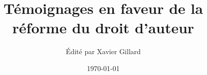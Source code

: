 \documentclass[11pt,liststotoc,bibtotoc]{scrbook}
\title{Témoignages en faveur de la réforme du droit d'auteur}
\author{Édité par Xavier Gillard}
\date{\today}
\begin{document}
\renewcommand{\labelitemi}{$\bullet$}

\maketitle



\tableofcontents











\end{document}
